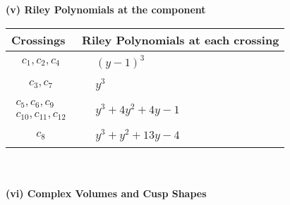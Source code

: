 \documentclass[1p]{elsarticle_modified}
\theoremstyle{definition}
\begin{document}
\newpage\renewcommand{\arraystretch}{1}
\flushleft \textbf{(v) Riley Polynomials at the component}\newline \\
\begin{tabular}{m{50pt}|m{274pt}}
Crossings & \hspace{64pt}Riley Polynomials at each crossing \\
\hline $$\begin{aligned}c_{1},c_{2},c_{4}\end{aligned}$$&$\begin{aligned}
&(y-1)^3
\end{aligned}$\\
\hline $$\begin{aligned}c_{3},c_{7}\end{aligned}$$&$\begin{aligned}
&y^3
\end{aligned}$\\
\hline $$\begin{aligned}c_{5},c_{6},c_{9}\\c_{10},c_{11},c_{12}\end{aligned}$$&$\begin{aligned}
&y^3+4 y^2+4 y-1
\end{aligned}$\\
\hline $$\begin{aligned}c_{8}\end{aligned}$$&$\begin{aligned}
&y^3+y^2+13 y-4
\end{aligned}$\\
\hline
\end{tabular}\\~\\
\newpage\flushleft \textbf{(vi) Complex Volumes and Cusp Shapes}
\end{document}
